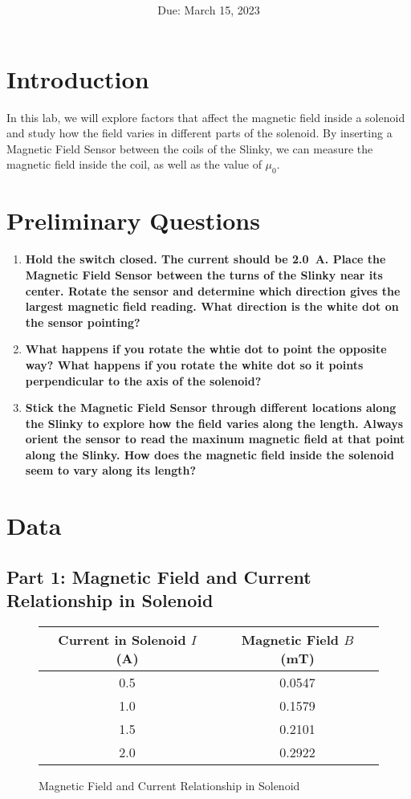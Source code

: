 \documentclass[article, 12pt]{article}
\title{
    \vspace{2in}
    \textmd{\textbf{\labTitle}}
    \normalsize\vspace{0.1in}\\
    \vspace{0.1in}\large{\text{\class: \professor}}
    \vspace{3in}
}
\author{\name}
\date{Due: March 15, 2023}
\begin{document}
    \maketitle
    \thispagestyle{empty}
    \pagebreak
    \section{Introduction}
     In this lab, we will explore factors that affect the magnetic field inside a solenoid and study how the field varies in different parts of the solenoid. By inserting a Magnetic Field Sensor between the coils of the Slinky, we can measure the magnetic field inside the coil, as well as the value of $\mu_0$.
     \section{Preliminary Questions}
     \begin{enumerate}[1.]
        \item \textbf{Hold the switch closed. The current should be \SI{2.0}{\ampere}. Place the Magnetic Field Sensor between the turns of the Slinky near its center. Rotate the sensor and determine which direction gives the largest magnetic field reading. What direction is the white dot on the sensor pointing?}
        \item \textbf{What happens if you rotate the whtie dot to point the opposite way? What happens if you rotate the white dot so it points perpendicular to the axis of the solenoid?}
        \item \textbf{Stick the Magnetic Field Sensor through different locations along the Slinky to explore how the field varies along the length. Always orient the sensor to read the maxinum magnetic field at that point along the Slinky. How does the magnetic field inside the solenoid seem to vary along its length?}
     \end{enumerate}
    \section{Data}
      \subsection{Part 1: Magnetic Field and Current Relationship in Solenoid}    
        \begin{figure}[H]
          \centering
          \begin{tabular}{|c|c|}
            \hline
            Current in Solenoid $I$ (\si{\ampere}) & Magnetic Field $B$ (\si{\milli\tesla})\\
            \hline
            0.5 & 0.0547 \\
            1.0 & 0.1579 \\
            1.5 & 0.2101 \\
            2.0 & 0.2922 \\
            \hline
          \end{tabular}
          \caption{Magnetic Field and Current Relationship in Solenoid}
          \label{fig:current}
        \end{figure}
\end{document}
